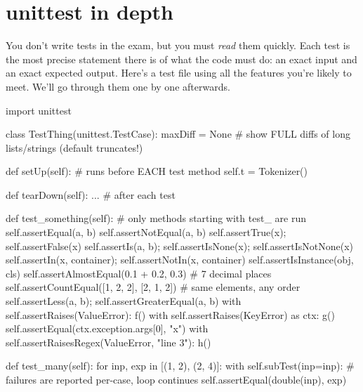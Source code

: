 \documentclass[10pt,a4paper]{article}
\begin{document}
\section{unittest in depth}
You don’t write tests in the exam, but you must \emph{read} them quickly. Each test is the most precise statement there is of what the code must do: an exact input and an exact expected output. Here’s a test file using all the features you’re likely to meet. We’ll go through them one by one afterwards.
\begin{pycode}
import unittest

class TestThing(unittest.TestCase):
    maxDiff = None               # show FULL diffs of long lists/strings (default truncates!)

    def setUp(self):             # runs before EACH test method
        self.t = Tokenizer()

    def tearDown(self): ...      # after each test

    def test_something(self):    # only methods starting with test_ are run
        self.assertEqual(a, b)
        self.assertNotEqual(a, b)
        self.assertTrue(x); self.assertFalse(x)
        self.assertIs(a, b); self.assertIsNone(x); self.assertIsNotNone(x)
        self.assertIn(x, container); self.assertNotIn(x, container)
        self.assertIsInstance(obj, cls)
        self.assertAlmostEqual(0.1 + 0.2, 0.3)          # 7 decimal places
        self.assertCountEqual([1, 2, 2], [2, 1, 2])      # same elements, any order
        self.assertLess(a, b); self.assertGreaterEqual(a, b)
        with self.assertRaises(ValueError):
            f()
        with self.assertRaises(KeyError) as ctx:
            g()
        self.assertEqual(ctx.exception.args[0], "x")
        with self.assertRaisesRegex(ValueError, "line 3"):
            h()

    def test_many(self):
        for inp, exp in [(1, 2), (2, 4)]:
            with self.subTest(inp=inp):      # failures are reported per-case, loop continues
                self.assertEqual(double(inp), exp)
\end{pycode}
\end{document}

